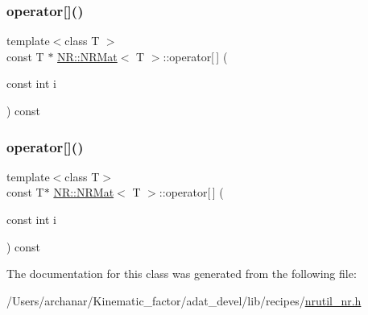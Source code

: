 \mbox{\label{classNR_1_1NRMat_aa45509152cfe7c8214521e8c5a98733a}} 
\subsubsection{\texorpdfstring{operator[]()}{operator[]()}\hspace{0.1cm}{\footnotesize\ttfamily [3/4]}}
{\footnotesize\ttfamily template$<$class T $>$ \\
const T $\ast$ \mbox{\hyperlink{classNR_1_1NRMat}{N\+R\+::\+N\+R\+Mat}}$<$ T $>$\+::operator\mbox{[}$\,$\mbox{]} (\begin{DoxyParamCaption}\item[{const int}]{i }\end{DoxyParamCaption}) const\hspace{0.3cm}{\ttfamily [inline]}}

\mbox{\label{classNR_1_1NRMat_a260aec593a5ef0c2166f6f4816ddfd2c}} 
\subsubsection{\texorpdfstring{operator[]()}{operator[]()}\hspace{0.1cm}{\footnotesize\ttfamily [4/4]}}
{\footnotesize\ttfamily template$<$class T$>$ \\
const T$\ast$ \mbox{\hyperlink{classNR_1_1NRMat}{N\+R\+::\+N\+R\+Mat}}$<$ T $>$\+::operator\mbox{[}$\,$\mbox{]} (\begin{DoxyParamCaption}\item[{const int}]{i }\end{DoxyParamCaption}) const\hspace{0.3cm}{\ttfamily [inline]}}



The documentation for this class was generated from the following file\+:\begin{DoxyCompactItemize}
\item 
/\+Users/archanar/\+Kinematic\+\_\+factor/adat\+\_\+devel/lib/recipes/\mbox{\hyperlink{lib_2recipes_2nrutil__nr_8h}{nrutil\+\_\+nr.\+h}}\end{DoxyCompactItemize}
